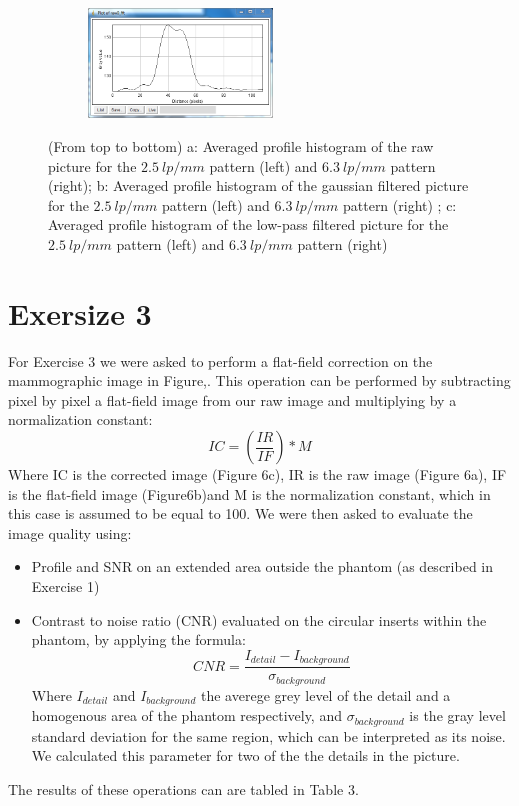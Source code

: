 \documentclass{article}
\begin{document}
\begin{figure}[h]
\begin{subfigure}[b]{0.5\textwidth}
		\end{subfigure}%
		\begin{subfigure}[b]{0.5\textwidth}
			\centering
			\includegraphics[height=1.15in]{./immagini_terza_prova/ex2/62_prof_histo_fft.PNG}
			
		\end{subfigure}%
		\bigbreak

	
	\caption{(From top to bottom) a: Averaged profile histogram of the raw picture for the $2.5\ lp/mm$ pattern (left) and $6.3\ lp/mm$ pattern (right); b: Averaged profile histogram of the gaussian filtered picture for the $2.5\ lp/mm$ pattern (left) and $6.3\ lp/mm$ pattern (right)  ; c: Averaged profile histogram of the low-pass filtered picture for the $2.5\ lp/mm$ pattern (left) and $6.3\ lp/mm$ pattern (right)}\label{two}
\end{figure}
\clearpage
\section*{Exersize 3}
For Exercise 3 we were asked to perform a flat-field correction on the mammographic image in Figure,. This operation can be performed by subtracting pixel by pixel a flat-field image from our raw image and multiplying by a normalization constant:
\begin{equation}
IC=(\frac{IR}{IF})* M
\end{equation}
Where IC is the corrected image (Figure 6c), IR is the raw image (Figure 6a), IF is the flat-field image (Figure6b)and M is the normalization constant, which in this case is assumed to be equal to 100.
We were then asked to evaluate the image quality using:
\begin{itemize}
	\item Profile and SNR on an extended area outside the phantom (as described in Exercise 1)
	\item Contrast to noise ratio (CNR) evaluated on the circular inserts within the phantom, by applying the formula:
	\begin{equation}
	CNR=\frac{I_{detail}-I_{background}}{\sigma_{background}}
	\end{equation}
	Where $I_{detail}$ and $I_{background}$ the averege grey level of the detail and a homogenous area of the phantom respectively, and $\sigma_{background}$ is the gray level standard deviation for the same region, which can be interpreted as its noise. We calculated this parameter for two of the the details in the picture.
\end{itemize}
The results of these operations can are tabled in Table 3. 
\end{document}

